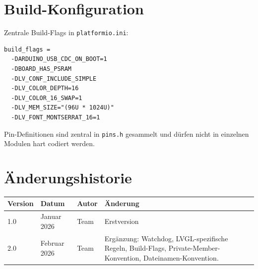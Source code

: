 \documentclass[a4paper,11pt]{article}
\begin{document}
\section{Build-Konfiguration}

Zentrale Build-Flags in \texttt{platformio.ini}:

\begin{lstlisting}
build_flags =
  -DARDUINO_USB_CDC_ON_BOOT=1
  -DBOARD_HAS_PSRAM
  -DLV_CONF_INCLUDE_SIMPLE
  -DLV_COLOR_DEPTH=16
  -DLV_COLOR_16_SWAP=1
  -DLV_MEM_SIZE="(96U * 1024U)"
  -DLV_FONT_MONTSERRAT_16=1
\end{lstlisting}

Pin-Definitionen sind zentral in \texttt{pins.h} gesammelt und dürfen nicht in einzelnen Modulen hart codiert werden.

\section{Änderungshistorie}

\begin{tabularx}{\textwidth}{l l l X}
\toprule
\rowcolor{tableheader}
\textbf{Version} & \textbf{Datum} & \textbf{Autor} & \textbf{Änderung} \\
\midrule
1.0 & Januar 2026 & Team & Erstversion \\
2.0 & Februar 2026 & Team & Ergänzung: Watchdog, LVGL-spezifische Regeln, Build-Flags, Private-Member-Konvention, Dateinamen-Konvention. \\
\bottomrule
\end{tabularx}
\end{document}
